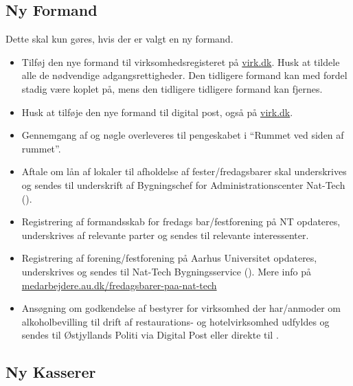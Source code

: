 \subsection{Ny Formand}
\label{sec:ny-formand}

Dette skal kun gøres, hvis der er valgt en ny formand.
\begin{itemize}
    \item Tilføj den nye formand til virksomhedsregisteret på \url{virk.dk}. Husk at tildele
    alle de nødvendige adgangsrettigheder. Den tidligere formand kan med fordel stadig være koplet på,
    mens den tidligere tidligere formand kan fjernes.
    \item Husk at tilføje den nye formand til digital post, også på \url{virk.dk}.
    \item Gennemgang af og nøgle overleveres til pengeskabet i ``Rummet ved siden af rummet''.
    \item Aftale om lån af lokaler til afholdelse af fester/fredagsbarer skal underskrives og
    sendes til underskrift af Bygningschef for Administrationscenter Nat-Tech ().
    \item Registrering af formandsskab for fredags bar/festforening på NT opdateres, underskrives
    af relevante parter og sendes til relevante interessenter.
    \item Registrering af forening/festforening på Aarhus Universitet opdateres, underskrives og sendes 
    til Nat-Tech Bygningsservice ().
    Mere info på \href{https://medarbejdere.au.dk/administration/bygninger/bygningsservice/nat-tech-bygningsservice/fredagsbarer-paa-nat-tech}{medarbejdere.au.dk/fredagsbarer-paa-nat-tech}
    \item Ansøgning om godkendelse af bestyrer for virksomhed der har/anmoder om alkoholbevilling 
    til drift af restaurations- og hotelvirksomhed udfyldes og sendes til Østjyllands Politi via
    Digital Post eller direkte til .
\end{itemize}

\subsection{Ny Kasserer}
\label{sec:ny-kasserer}


